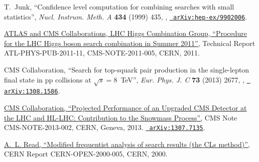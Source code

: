 \documentclass[12pt]{thesis}  %
\begin{document}
\begin{thebibliography}{100}
\hrefCMSnoop {} {T.~Junk, ``Confidence level computation for combining searches
  with small statistics'',} \textit{ Nucl. Instrum. Meth. A} \textbf{ 434}
  (1999) 435,
  \href{http://dx.doi.org/10.1016/S0168-9002(99)00498-2}{},
  \href{http://www.arXiv.org/abs/hep-ex/9902006}{\texttt{
  arXiv:hep-ex/9902006}}.

\href {http://cdsweb.cern.ch/record/1379837} {{ATLAS and CMS Collaborations,
  LHC Higgs Combination Group}, ``Procedure for the {LHC} {H}iggs boson search
  combination in {S}ummer 2011'',} Technical Report ATL-PHYS-PUB-2011-11,
  CMS-NOTE-2011-005, CERN, 2011.

\hrefCMSnoop {} {{ CMS} Collaboration, ``Search for top-squark pair production
  in the single-lepton final state in pp collisions at $\sqrt{s} = 8$~{TeV}'',}
  \textit{ Eur. Phys. J. C} \textbf{ 73} (2013) 2677,
  \href{http://dx.doi.org/10.1140/epjc/s10052-013-2677-2}{},
  \href{http://www.arXiv.org/abs/1308.1586}{\texttt{ arXiv:1308.1586}}.

\href {https://cds.cern.ch/record/1565454} {{ CMS} Collaboration, ``{Projected
  Performance of an Upgraded CMS Detector at the LHC and HL-LHC: Contribution
  to the Snowmass Process}'',} CMS Note CMS-NOTE-2013-002, CERN, Geneva, 2013.
\newblock \href{http://www.arXiv.org/abs/1307.7135}{\texttt{ arXiv:1307.7135}}.

\href {http://cdsweb.cern.ch/record/451614} {A.~L. Read, ``Modified frequentist
  analysis of search results (the CLs method)'',} {CERN} Report
  CERN-OPEN-2000-005, CERN, 2000.

\end{thebibliography}\endgroup
\end{document}
